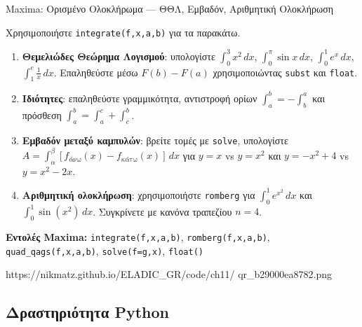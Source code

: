 %

\casactivbox%
  {Maxima: Ορισμένο Ολοκλήρωμα — ΘΘΛ, Εμβαδόν, Αριθμητική Ολοκλήρωση}%
  {%
    \label{cas:ch11_defintegral}
    Χρησιμοποιήστε \texttt{integrate(f,x,a,b)} για τα παρακάτω.
    \begin{enumerate}[label=(\alph*),itemsep=2pt]
      \item \textbf{Θεμελιώδες Θεώρημα Λογισμού}: υπολογίστε
        $\int_0^3 x^2\,dx$, $\int_0^{\pi}\sin x\,dx$,
        $\int_0^1 e^x\,dx$, $\int_1^e \frac{1}{x}\,dx$.
        Επαληθεύστε μέσω $F(b)-F(a)$ χρησιμοποιώντας
        \texttt{subst} και \texttt{float}.
      \item \textbf{Ιδιότητες}: επαληθεύστε γραμμικότητα,
        αντιστροφή ορίων $\int_a^b = -\int_b^a$
        και πρόσθεση $\int_a^b = \int_a^c + \int_c^b$.
      \item \textbf{Εμβαδόν μεταξύ καμπυλών}:
        βρείτε τομές με \texttt{solve}, υπολογίστε
        $A = \int_{\alpha}^{\beta}[f_{\text{άνω}}(x)-f_{\text{κάτω}}(x)]\,dx$
        για $y=x$ vs $y=x^2$ και $y=-x^2+4$ vs $y=x^2-2x$.
      \item \textbf{Αριθμητική ολοκλήρωση}: χρησιμοποιήστε
        \texttt{romberg} για $\int_0^1 e^{x^2}\,dx$ και
        $\int_0^1\sin(x^2)\,dx$.
        Συγκρίνετε με κανόνα τραπεζίου $n=4$.
    \end{enumerate}
    \smallskip
    \textbf{Εντολές Maxima:}
    \texttt{integrate(f,x,a,b)}, \texttt{romberg(f,x,a,b)},
    \texttt{quad\_qags(f,x,a,b)}, \texttt{solve(f=g,x)},
    \texttt{float()}
  }%
  {https://nikmatz.github.io/ELADIC_GR/code/ch11/}%
  {qr_b29000ea8782.png}

\subsection*{Δραστηριότητα Python}

